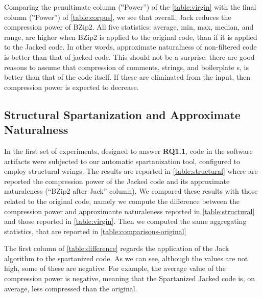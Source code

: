 Comparing the penultimate column (‟Power”) of the \cref{table:virgin}
with the final column (‟Power”) of
\cref{table:corpus}, we see that overall, Jack reduces the compression power of
BZip2. All five statistics: average, min, max, median, and range, are higher
when BZip2 is applied to the original code, than if it is applied to the Jacked
code. In other words, approximate naturalness of non-filtered code is better
than that of jacked code. This should not be a surprise: there are good reasons
to assume that compression of comments, strings, and boilerplate s,
is better than that of the code itself. If these are eliminated from the input,
then compression power is expected to decrease.

\subsection{Structural Spartanization and Approximate Naturalness}

In the first set of experiments, designed to answer \textbf{RQ1.1}, \Java code
in the software artifacts were subjected to our automatic spartanization
tool, configured to employ structural wrings.
The results are reported in \cref{table:structural} where are reported
the compression power of the Jacked code and its approximate
naturaleness (``BZip2 after Jack'' column).
We compared these results %
with those related to the original code, namely we compute the difference 
between the compression power and approximante naturaleness reported in \cref{table:structural}
and those reported in \cref{table:virgin}.
Then we computed the same aggregating statistics, that are reported in 
\cref{table:comparisons-original}

The first column of \cref{table:difference} regards the application of the Jack
algorithm to the spartanized code. As we can see, although the values
are not high, some of these are negative.
For example, the average value of the compression power is negative,
meaning that the Spartanized Jacked code is, on average, less compressed than the original.

